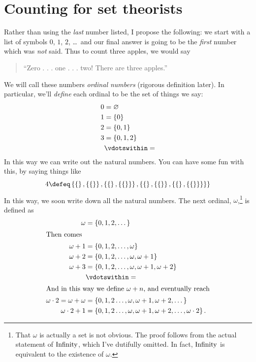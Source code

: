 \section{Counting for set theorists}
Rather than using the \emph{last} number listed, I propose the following:
we start with a list of symbols $0$, $1$, $2$, \dots\ and our final answer
is going to be the \emph{first} number which was \emph{not} said.
Thus to count three apples, we would say 
\begin{quote}
	``Zero . . . one . . . two!  There are three apples.''
\end{quote}
We will call these numbers \emph{ordinal numbers} (rigorous definition later).
In particular, we'll \emph{define} each ordinal to be the set of things we say:
\begin{align*}
	0 &= \varnothing \\
	1 &= \{0\} \\
	2 &= \{0,1\} \\
	3 &= \{0,1,2\} \\
	&\vdotswithin=
\end{align*}
In this way we can write out the natural numbers.
You can have some fun with this, by saying things like
\[
	4 \defeq
	\left\{ 
		\left\{  \right\},
		\left\{ \left\{  \right\} \right\},
		\left\{ \left\{  \right\}, \left\{ \left\{  \right\} \right\} \right\},
		\left\{ 
			\left\{  \right\},
			\left\{ \left\{  \right\} \right\},
			\left\{ \left\{  \right\}, \left\{ \left\{  \right\} \right\} \right\}
		\right\}
	\right\}
\]
In this way, we soon write down all the natural numbers.
The next ordinal, $\omega$,\footnote{
	That $\omega$ is actually a set is not obvious.
	The proof follows from the actual statement of $\mathrm{Infinity}$,
	which I've dutifully omitted.
	In fact, $\mathrm{Infinity}$ is equivalent to the existence of $\omega$.
} is defined as
\begin{align*}
	\omega &= \left\{ 0, 1, 2, \dots \right\} \\
	\intertext{Then comes}
	\omega+1 &= \left\{ 0, 1, 2, \dots, \omega \right\} \\
	\omega+2 &= \left\{ 0, 1, 2, \dots, \omega, \omega+1 \right\} \\
	\omega+3 &= \left\{ 0, 1, 2, \dots, \omega, \omega+1, \omega+2 \right\} \\
	&\vdotswithin= \\
	\intertext{And in this way we define $\omega+n$, and eventually reach}
	\omega \cdot 2 = \omega+\omega &= \left\{ 0, 1, 2 \dots, \omega, \omega+1, \omega+2, \dots \right\} \\
	\omega \cdot 2 + 1 &= \left\{ 0, 1, 2 \dots, \omega, \omega+1, \omega+2, \dots, \omega \cdot 2 \right\}.
\end{align*}
